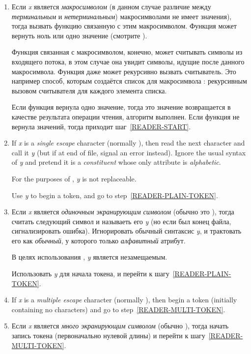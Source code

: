 \begin{enumerate}
\item Если \emph{x} является \emph{макросимволом} (в данном случае
  различие между \emph{терминальным} и \emph{нетерминальным})
  макросимволами не имеет значения), тогда вызвать функцию связанную с
  этим макросимволом. Функция может вернуть ноль или одно значение
  (смотрите ).

  Функция связанная с макросимволом, конечно, может считывать символы из
  входящего потока, в этом случае она увидит символы, идущие после
  данного макросимвола. Функция даже может рекурсивно вызвать
  считыватель. Это например способ, которым создаётся список для
  макросимвола \cd{(}: рекурсивным вызовом считывателя для каждого
  элемента списка.

  Если функция вернула одно значение, тогда это значение возвращается
  в качестве результата операции чтения, алгоритм выполнен.  Если
  функция не вернула значений, тогда приходит шаг~\ref{READER-START}.

\item
If \emph{x} is a \emph{single escape} character (normally \cd{{\Xbackslash}}),
then read the next character and call it \emph{y}
(but if at end of file, signal an error instead).
Ignore the usual syntax of \emph{y}
and pretend it is a \emph{constituent} whose only attribute is
\emph{alphabetic}.

For the purposes of , \emph{y} is not replaceable.

Use \emph{y} to begin a token, and go to step~\ref{READER-PLAIN-TOKEN}.

\item Если \emph{x} является \emph{одиночным экранирующим символом}
  (обычно это \cd{{\Xbackslash}}), тогда считать следующий символ и
  называеть его \emph{y} (но если был конец файла, сигнализировать
  ошибка). Игнорировать обычный синтаксис \emph{y}, и трактовать его
  как \emph{обычный}, у которого только \emph{алфавитный} атрибут.

  В целях использования , \emph{y} является незамещаемым.
  
  Использовать \emph{y} для начала токена, и перейти к
  шагу~\ref{READER-PLAIN-TOKEN}.

\item
If \emph{x} is a \emph{multiple escape} character (normally \cd{|}),
then begin a token (initially
containing no characters) and go to step~\ref{READER-MULTI-TOKEN}.

\item Если \emph{x} является \emph{много экранирующим символом}
  (обычно \cd{|}), тогда начать запись токена (первоначально нулевой
  длины) и перейти к шагу~\ref{READER-MULTI-TOKEN}.


\end{enumerate}
